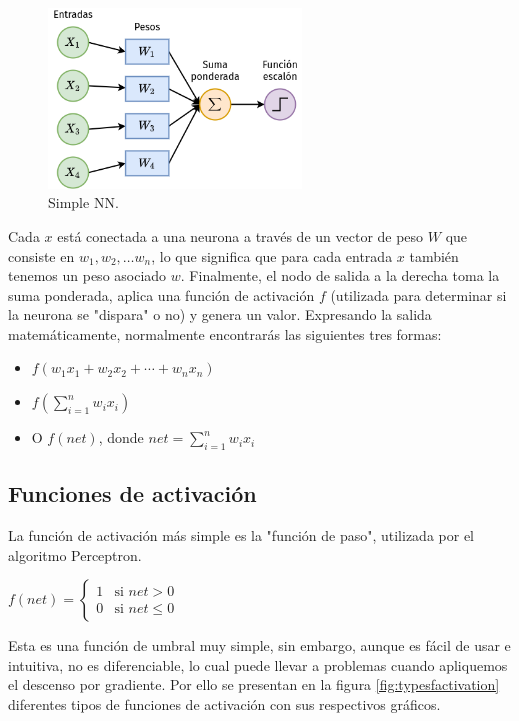 \documentclass[a4paper,12pt]{article}
\begin{document}
\begin{figure}[H]
	\begin{center}				
		\includegraphics[width=0.6\textwidth]{020.png}
		\caption{Simple NN.}
		\label{fig:simplenn}
	\end{center}
\end{figure}

Cada $x$ está conectada a una neurona a través de un vector de peso $W$ que consiste en $w_1, w_2, \ldots w_n$, lo que significa que para cada entrada $x$ también tenemos un peso asociado $w$.
Finalmente, el nodo de salida a la derecha toma la suma ponderada, aplica una función de activación $f$ (utilizada para determinar si la neurona se "dispara" o no) y genera un valor. Expresando la salida matemáticamente, normalmente encontrarás las siguientes tres formas:
\begin{itemize}[noitemsep, topsep=2pt]
	\item $f(w_1x_1 + w_2x_2 + \cdots + w_nx_n)$
	\item $f(\sum_{i=1}^{n} w_ix_i)$	
	\item O $f(net)$, donde $net = \sum_{i=1}^{n} w_ix_i$
\end{itemize}

\subsection{Funciones de activación}
La función de activación más simple es la "función de paso", utilizada por el algoritmo Perceptron.

$
f(net) =
\left\{
\begin{array}{ll}
	1 & \mbox{si } net > 0    \\
	0 & \mbox{si } net \leq 0 
\end{array}
\right.
$

Esta es una función de umbral muy simple, sin embargo, aunque es fácil de usar e intuitiva, no es diferenciable, lo cual puede llevar a problemas cuando apliquemos el descenso por gradiente.
Por ello se presentan en la figura \ref{fig:typesfactivation} diferentes tipos de funciones de activación con sus respectivos gráficos.
\end{document}
